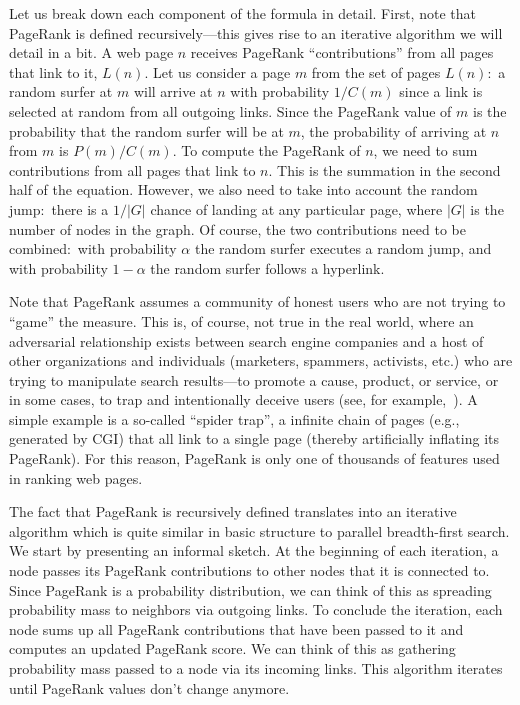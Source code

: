 Let us break down each component of the formula in detail.  First,
note that PageRank is defined recursively---this gives rise to an
iterative algorithm we will detail in a bit.  A web page $n$ receives
PageRank ``contributions'' from all pages that link to it, $L(n)$.
Let us consider a page $m$ from the set of pages $L(n)$:\ a random
surfer at $m$ will arrive at $n$ with probability $1/C(m)$ since a
link is selected at random from all outgoing links.  Since the PageRank
value of $m$ is the probability that the random surfer will be at $m$,
the probability of arriving at $n$ from $m$ is $P(m)/C(m)$.  To
compute the PageRank of $n$, we need to sum contributions from all
pages that link to $n$.  This is the summation in the second half of
the equation.  However, we also need to take into account the random
jump:\ there is a $1/|G|$ chance of landing at any particular page,
where $|G|$ is the number of nodes in the graph.  Of course, the two
contributions need to be combined:\ with probability $\alpha$ the
random surfer executes a random jump, and with probability $1-\alpha$
the random surfer follows a hyperlink.

Note that PageRank assumes a community of honest users who are not
trying to ``game'' the measure.  This is, of course, not true in the
real world, where an adversarial relationship exists between search
engine companies and a host of other organizations and individuals
(marketers, spammers, activists, etc.) who are trying to manipulate
search results---to promote a cause, product, or service, or in some
cases, to trap and intentionally deceive users (see, for
example,~\cite{Baeza-Yates_etal_2005,Garcia-Molina_etal_2005}).  A
simple example is a so-called ``spider trap'', a infinite chain of
pages (e.g., generated by CGI) that all link to a single page (thereby
artificially inflating its PageRank).  For this reason, PageRank is
only one of thousands of features used in ranking web pages.

The fact that PageRank is recursively defined 
translates into an iterative algorithm which is quite similar in basic
structure to parallel breadth-first search.  We start by presenting an
informal sketch.  At the beginning of each iteration, a node passes its
PageRank contributions to other nodes that it is connected to.  Since
PageRank is a probability distribution, we can think of this as
spreading probability mass to neighbors via outgoing links.  To
conclude the iteration, each node sums up all PageRank contributions
that have been passed to it and computes an updated PageRank score.
We can think of this as gathering probability mass passed to a node
via its incoming links.  This algorithm iterates until PageRank values
don't change anymore.

